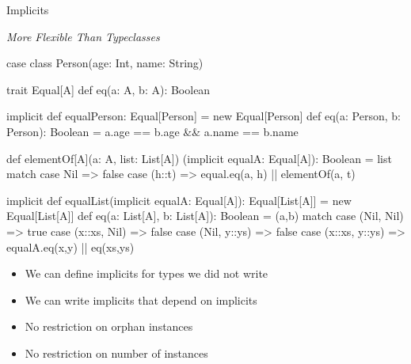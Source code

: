 \documentclass[usenames,dvipsnames,svgnames,table,aspectratio=169,mathserif]{beamer}
\newcommand{\nl}{\vspace{\baselineskip}}
\newcommand{\pnl}{\pause \nl}
\begin{document}


\begin{frame}
\begin{center}
\Huge{Implicits}

\nl

\large{{\it More Flexible Than Typeclasses}\texttrademark}
\end{center}
\end{frame}


\begin{frame}[fragile]
\begin{scalacode}
case class Person(age: Int, name: String)
\end{scalacode}

\pnl

\begin{scalacode}
trait Equal[A] {
  def eq(a: A, b: A): Boolean
}
\end{scalacode}

\pnl

\begin{scalacode}
implicit def equalPerson: Equal[Person] = new Equal[Person] {
  def eq(a: Person, b: Person): Boolean =
    a.age == b.age && a.name == b.name
}
\end{scalacode}
\end{frame}


\begin{frame}[fragile]
\begin{scalacode}
def elementOf[A](a: A, list: List[A])
                (implicit equalA: Equal[A]): Boolean = {
  list match {
    case Nil => false
    case (h::t) => equal.eq(a, h) || elementOf(a, t)
  }
}
\end{scalacode}
\end{frame}


\begin{frame}[fragile]
\begin{scalacode}
implicit def equalList(implicit equalA: Equal[A]): Equal[List[A]] =
  new Equal[List[A]] {
    def eq(a: List[A], b: List[A]): Boolean = {
      (a,b) match {
        case (Nil,   Nil)   => true
        case (x::xs, Nil)   => false
        case (Nil,   y::ys) => false
        case (x::xs, y::ys) => equalA.eq(x,y) || eq(xs,ys)
      }
    }
  }
\end{scalacode}
\end{frame}


\begin{frame}
\begin{itemize}
\item We can define implicits for types we did not write
\item We can write implicits that depend on implicits
\end{itemize}

\pnl

\begin{itemize}
\item No restriction on orphan instances
\item No restriction on number of instances
\end{itemize}
\end{frame}
\end{document}
